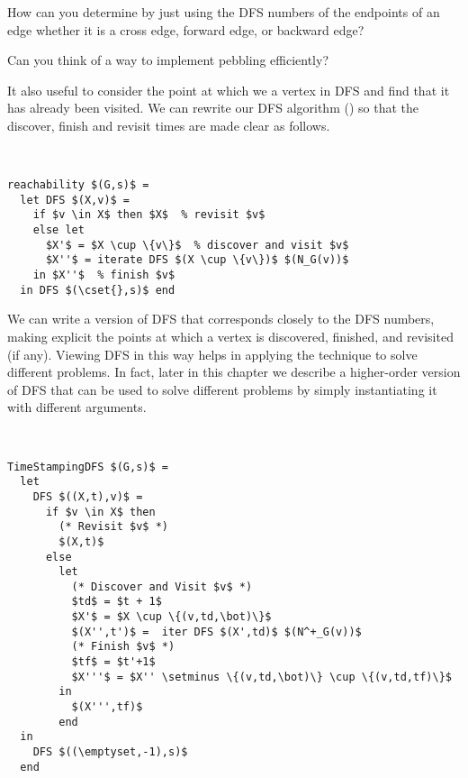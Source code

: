 \newcommand{\revisit}{\ttt{revisit}}
\newcommand{\discover}{\ttt{discover}}
\newcommand{\finish}{\ttt{finish}}

\begin{exercise}
How can you determine by just using the DFS numbers of the endpoints
of an edge whether it is a cross edge, forward edge, or backward edge?
\end{exercise}

\begin{question}
Can you think of a way to implement pebbling efficiently? 
\end{question}

It also useful to consider the point at which we  a vertex in DFS and find that it has already been
visited.     We can rewrite our DFS algorithm
() so that the discover, finish and revisit
times are made clear as follows.

\begin{algorithm}~
\begin{lstlisting}
reachability $(G,s)$ = 
  let DFS $(X,v)$ =       
    if $v \in X$ then $X$  % revisit $v$
    else let
      $X'$ = $X \cup \{v\}$  % discover and visit $v$
      $X''$ = iterate DFS $(X \cup \{v\})$ $(N_G(v))$ 
    in $X''$  % finish $v$
  in DFS $(\cset{},s)$ end
\end{lstlisting}
\end{algorithm}

\begin{notesonly}
We can write a version of DFS that corresponds closely to the DFS
numbers, making explicit the points at which a vertex is discovered,
finished, and revisited (if any).  Viewing DFS in this way helps in
applying the technique to solve different problems.  In fact, later in
this chapter we describe a higher-order version of DFS that can be
used to solve different problems by simply instantiating it with
different arguments.  

\begin{algorithm}
~\\
\begin{lstlisting}
TimeStampingDFS $(G,s)$ = 
  let
    DFS $((X,t),v)$ =
      if $v \in X$ then 
        (* Revisit $v$ *)
        $(X,t)$ 
      else
        let
          (* Discover and Visit $v$ *)
          $td$ = $t + 1$
          $X'$ = $X \cup \{(v,td,\bot)\}$ 
          $(X'',t')$ =  iter DFS $(X',td)$ $(N^+_G(v))$ 
          (* Finish $v$ *)
          $tf$ = $t'+1$
          $X'''$ = $X'' \setminus \{(v,td,\bot)\} \cup \{(v,td,tf)\}$ 
        in
          $(X''',tf)$ 
        end
  in 
    DFS $((\emptyset,-1),s)$ 
  end
\end{lstlisting}
\end{algorithm}
\end{notesonly}


